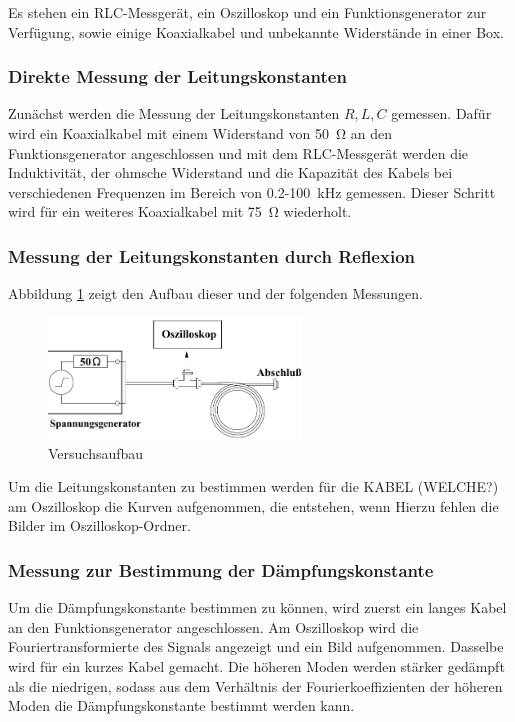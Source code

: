 Es stehen ein RLC-Messgerät, ein Oszilloskop und ein Funktionsgenerator zur Verfügung, sowie einige Koaxialkabel und unbekannte Widerstände in einer Box.
\subsubsection*{Direkte Messung der Leitungskonstanten}
Zunächst werden die Messung der Leitungskonstanten $R,L,C$ gemessen. Dafür wird ein Koaxialkabel mit einem Widerstand von \SI{50}{\ohm} an den Funktionsgenerator angeschlossen und mit dem RLC-Messgerät werden die Induktivität, der ohmsche Widerstand und die Kapazität des Kabels bei verschiedenen Frequenzen im Bereich von 0.2-\SI{100}{\kilo\hertz} gemessen. Dieser Schritt wird für ein weiteres Koaxialkabel mit \SI{75}{\ohm} wiederholt.
\subsubsection*{Messung der Leitungskonstanten durch Reflexion}
Abbildung \ref{fig:Aufbau} zeigt den Aufbau dieser und der folgenden Messungen. \\
\begin{figure}[h]
	\centering
	\includegraphics[width=0.6\textwidth]{Aufbau.pdf}
	\caption{Versuchsaufbau \cite{E2}}
	\label{fig:Aufbau}
\end{figure}
Um die Leitungskonstanten zu bestimmen werden für die KABEL (WELCHE?) am Oszilloskop die Kurven aufgenommen, die entstehen, wenn 
Hierzu fehlen die Bilder im Oszilloskop-Ordner.

\subsubsection*{Messung zur Bestimmung der Dämpfungskonstante}
Um die Dämpfungskonstante bestimmen zu können, wird zuerst ein langes Kabel an den Funktionsgenerator angeschlossen. Am Oszilloskop wird die Fouriertransformierte des Signals angezeigt und ein Bild aufgenommen. Dasselbe wird für ein kurzes Kabel gemacht. Die höheren Moden werden stärker gedämpft als die niedrigen, sodass aus dem Verhältnis der Fourierkoeffizienten der höheren Moden die Dämpfungskonstante bestimmt werden kann.
